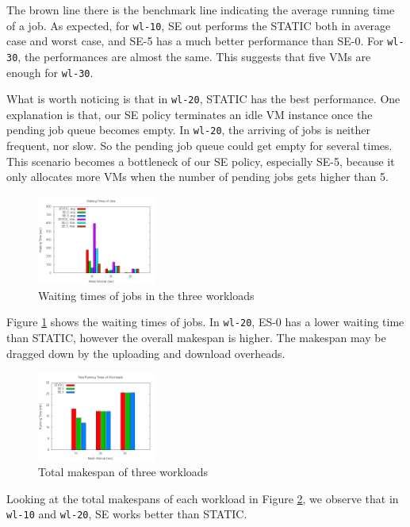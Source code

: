 The brown line there is the benchmark line indicating the average
running time of a job. As expected, for \texttt{wl-10}, SE out
performs the STATIC both in average case and worst case, and SE-5 has
a much better performance than SE-0. For \texttt{wl-30}, the
performances are almost the same. This suggests that five VMs are
enough for \texttt{wl-30}.

What is worth noticing is that in \texttt{wl-20}, STATIC has the best
performance. One explanation is that, our SE policy terminates an idle
VM instance once the pending job queue becomes empty. In
\texttt{wl-20}, the arriving of jobs is neither frequent, nor slow. So
the pending job queue could get empty for several times. This scenario
becomes a bottleneck of our SE policy, especially SE-5, because it
only allocates more VMs when the number of pending jobs gets higher
than 5.

\begin{figure}[!t]
\centering
\includegraphics[width=0.35\textwidth]{pictures/all-waittimes.png}
\caption{Waiting times of jobs in the three workloads}
\label{figure_jobwaittime}
\end{figure}

Figure \ref{figure_jobwaittime} shows the waiting times of jobs. In
\texttt{wl-20}, ES-0 has a lower waiting time than STATIC, however the
overall makespan is higher. The makespan may be dragged down by the
uploading and download overheads.

\begin{figure}[!t]
\centering
\includegraphics[width=0.35\textwidth]{pictures/workload-runtime.png}
\caption{Total makespan of three workloads}
\label{figure_workloadmakespan}
\end{figure}

Looking at the total makespans of each workload in Figure
\ref{figure_workloadmakespan}, we observe that in \texttt{wl-10} and
\texttt{wl-20}, SE works better than STATIC.



